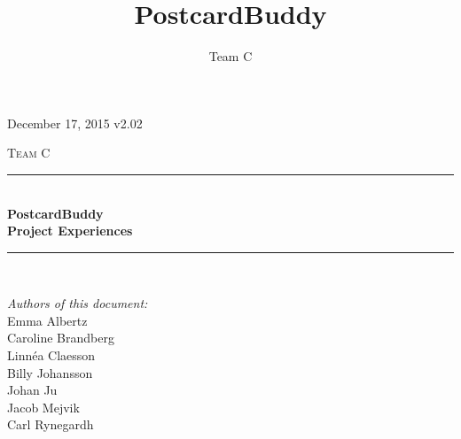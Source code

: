 \documentclass[10pt,a4paper]{article}
\title{PostcardBuddy}
\author{Team C}
\begin{document}
\begin{titlepage}
\newcommand{\HRule}{\rule{\linewidth}{0.5mm}}


\begin{flushright}
December 17, 2015 v2.02\\[3cm]
\end{flushright}


\centering
\textsc{\LARGE Team C}\\[0.5cm]

\HRule \\[0.4cm]
{ \huge \bfseries PostcardBuddy}\\[0.3cm]
{\Large \bfseries Project Experiences}\\[0.4cm] %
\HRule \\[1.5cm]

\vfill
\begin{flushleft}
\textit{Authors of this document:}\\
Emma Albertz\\
Caroline Brandberg\\
Linnéa Claesson\\
Billy Johansson\\
Johan Ju\\
Jacob Mejvik\\
Carl Rynegardh
\end{flushleft}

\end{titlepage}



%



\setcounter{tocdepth}{2}
\tableofcontents
\newpage
{}

\end{document}
